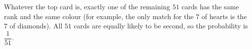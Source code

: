 Whatever the top card is, exactly one of the remaining $51$ cards has the same rank and the same colour (for example, the only match for the $7$ of hearts is the $7$ of diamonds). All $51$ cards are equally likely to be second, so the probability is $\boxed{\dfrac{1}{51}}$.
